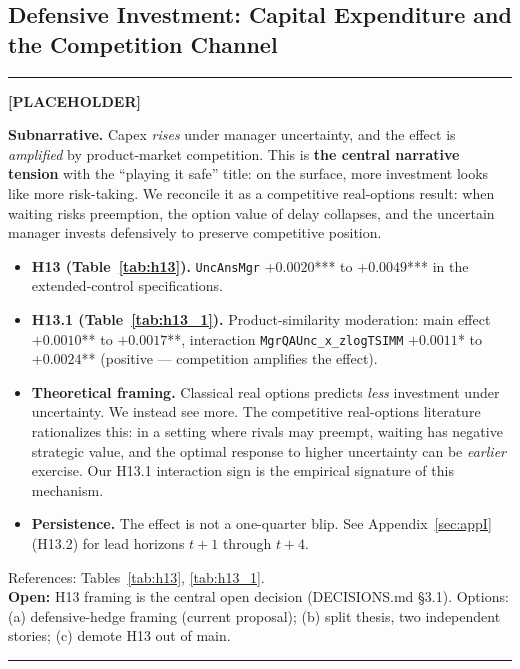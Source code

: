\documentclass[11pt,a4paper,twocolumn]{article}
\newenvironment{placeholder}{%
  \par\medskip\noindent%
  {\color{placeholderaccent}\rule{\linewidth}{0.4pt}}\par%
  \noindent\textbf{\color{placeholderaccent}[PLACEHOLDER]}\par%
  \smallskip\itshape%
}{%
  \par\upshape\smallskip%
  {\color{placeholderaccent}\rule{\linewidth}{0.4pt}}\par\medskip%
}
\begin{document}
\subsection{Defensive Investment: Capital Expenditure and the Competition Channel}
\label{sec:investment}
\begin{placeholder}
\textbf{Subnarrative.} Capex \emph{rises} under manager uncertainty,
and the effect is \emph{amplified} by product-market competition. This
is \textbf{the central narrative tension} with the ``playing it safe''
title: on the surface, more investment looks like more risk-taking.
We reconcile it as a competitive real-options result: when waiting
risks preemption, the option value of delay collapses, and the
uncertain manager invests defensively to preserve competitive position.
\begin{itemize}
  \item \textbf{H13 (Table~\ref{tab:h13}).} \texttt{UncAnsMgr}
        $+0.0020$*** to $+0.0049$*** in the extended-control
        specifications.
  \item \textbf{H13.1 (Table~\ref{tab:h13_1}).} Product-similarity
        moderation: main effect $+0.0010$** to $+0.0017$**, interaction
        \texttt{MgrQAUnc\_x\_zlogTSIMM} $+0.0011$* to $+0.0024$**
        (positive --- competition amplifies the effect).
  \item \textbf{Theoretical framing.} Classical real options
        \citep{DixitPindyck1994} predicts \emph{less} investment under
        uncertainty. We instead see more. The competitive real-options
        literature \citep{Grenadier2002,Aguerrevere2009} rationalizes
        this: in a setting where rivals may preempt, waiting has
        negative strategic value, and the optimal response to higher
        uncertainty can be \emph{earlier} exercise. Our H13.1 interaction
        sign is the empirical signature of this mechanism.
  \item \textbf{Persistence.} The effect is not a one-quarter blip. See
        Appendix~\ref{sec:appI} (H13.2) for lead horizons $t+1$ through
        $t+4$.
\end{itemize}
References: Tables~\ref{tab:h13}, \ref{tab:h13_1}.\\
\textbf{Open:} H13 framing is the central open decision (DECISIONS.md
\S3.1). Options: (a) defensive-hedge framing (current proposal);
(b) split thesis, two independent stories; (c) demote H13 out of
main.
\end{placeholder}

\end{document}
